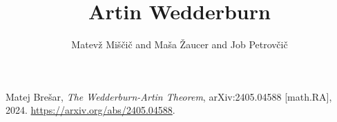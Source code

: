 \documentclass{article}
\title{Artin Wedderburn}
\author{Matevž Miščič and Maša Žaucer and Job Petrovčič}
\begin{document}
\maketitle


\begin{thebibliography}{99}

    Matej Brešar, 
    \textit{The Wedderburn-Artin Theorem}, 
    arXiv:2405.04588 [math.RA], 2024. 
    \url{https://arxiv.org/abs/2405.04588}.
    
    \end{thebibliography}
\end{document}
